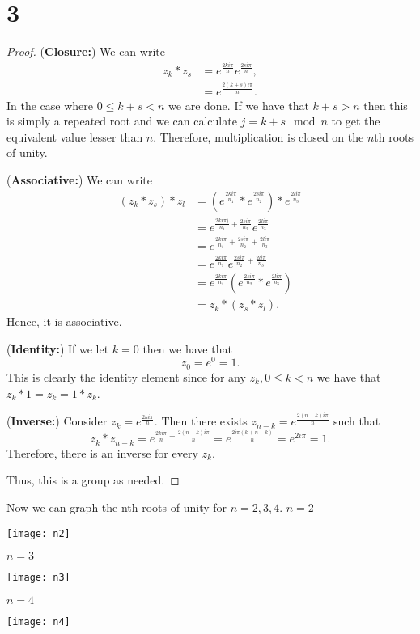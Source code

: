 \documentclass{article}
\begin{document}
\section*{3}
\begin{proof}

    (\textbf{Closure:})
    We can write
    \begin{align*}
        z_k * z_s & = e^{\frac{2ki\pi}{n}}e^{\frac{2si\pi}{n}}, \\
                  & = e^{\frac{2(k + s)i\pi}{n}}.
    \end{align*}
    In the case where $0 \leq k + s < n$ we are done. If we have that
    $k + s > n$ then this is simply a repeated root and we can calculate
    $j = k + s \mod n$ to get the equivalent value lesser than $n$. Therefore,
    multiplication is closed on the $n$th roots of unity.

    (\textbf{Associative:}) We can write
    \begin{align*}
        (z_k * z_s) * z_l & = (e^{\frac{2ki\pi }{n_1}} * e^{\frac{2si\pi }{n_2}})
        *e^{\frac{2li\pi }{n_3}}                                                                          \\
                          & = e^{\frac{2ki\pi)}{n_1} + \frac{2si\pi}{n_2}} e^{\frac{2li\pi }{n_3}}        \\
                          & = e^{\frac{2ki\pi}{n_1}+\frac{2si\pi}{n_2}+\frac{2li\pi}{n_3}}                \\
                          & =e^{\frac{2ki\pi }{n_1}} e^{\frac{2si\pi}{n_2} + \frac{2li\pi}{n_3}}          \\
                          & = e^{\frac{2ki\pi }{n_1}} (e^{\frac{2si\pi }{n_2}} * e^{\frac{2li\pi }{n_3}}) \\
                          & = z_k*(z_s*z_l).
    \end{align*}
    Hence, it is associative.

    (\textbf{Identity:}) If we let $k = 0$ then we have that
    \begin{equation*}
        z_0 = e^0 = 1.
    \end{equation*}
    This is clearly the identity element since for any $z_k, 0 \leq k < n$ we have that
    $z_k * 1 = z_k = 1 * z_k$.

    (\textbf{Inverse:}) Consider $z_k = e^{\frac{2ki\pi }{n}}$. Then there exists
    $z_{n-k} = e^{\frac{2(n-k)i \pi }{n}}$ such that
    \begin{equation*}
        z_k*z_{n-k} = e^{\frac{2ki\pi }{n} + \frac{2(n-k)i\pi }{n}}
        = e^{\frac{2i\pi(k + n - k)}{n}} = e^{2i\pi} = 1.
    \end{equation*}
    Therefore, there is an inverse for every $z_k$.

    Thus, this is a group as needed.
\end{proof}

Now we can graph the nth roots of unity for $n = 2,3,4$.
$n=2$

\texttt{[image: n2]}

$n=3$

\texttt{[image: n3]}

$n=4$

\texttt{[image: n4]}
\end{document}
